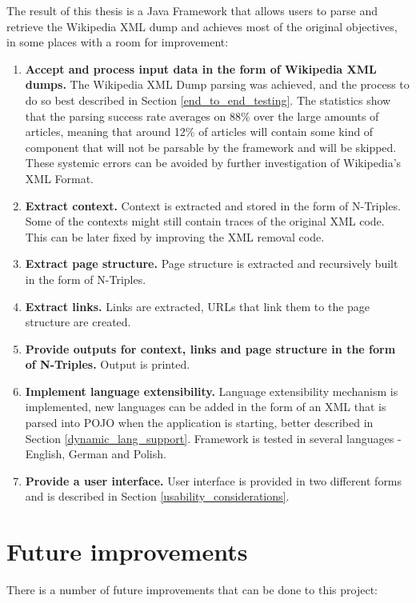 \documentclass[thesis=M,english,hidelinks]{FITthesis}[2019/12/23]
\begin{document}
The result of this thesis is a Java Framework that allows users to parse and retrieve the Wikipedia XML dump and achieves most of the original objectives, in some places with a room for improvement:
\begin{enumerate}
	\item \textbf{Accept and process input data in the form of Wikipedia XML dumps.} The Wikipedia XML Dump parsing was achieved, and the process to do so best described in Section \ref{end_to_end_testing}. The statistics show that the parsing success rate averages on 88\% over the large amounts of articles, meaning that around 12\% of articles will contain some kind of component that will not be parsable by the framework and will be skipped. These systemic errors can be avoided by further investigation of Wikipedia's XML Format.
	\item \textbf{Extract context.} Context is extracted and stored in the form of N-Triples. Some of the contexts might still contain traces of the original XML code. This can be later fixed by improving the XML removal code.
	\item \textbf{Extract page structure.} Page structure is extracted and recursively built in the form of N-Triples.
	\item \textbf{Extract links.} Links are extracted, URLs that link them to the page structure are created.
	\item \textbf{Provide outputs for context, links and page structure in the form of N-Triples.} Output is printed.
	\item \textbf{Implement language extensibility.} Language extensibility mechanism is implemented, new languages can be added in the form of an XML that is parsed into \gls{POJO} when the application is starting, better described in Section \ref{dynamic_lang_support}. Framework is tested in several languages - English, German and Polish.
	\item \textbf{Provide a user interface.} User interface is provided in two different forms and is described in Section \ref{usability_considerations}.
\end{enumerate} 


\section{Future improvements}

There is a number of future improvements that can be done to this project:
\end{document}
